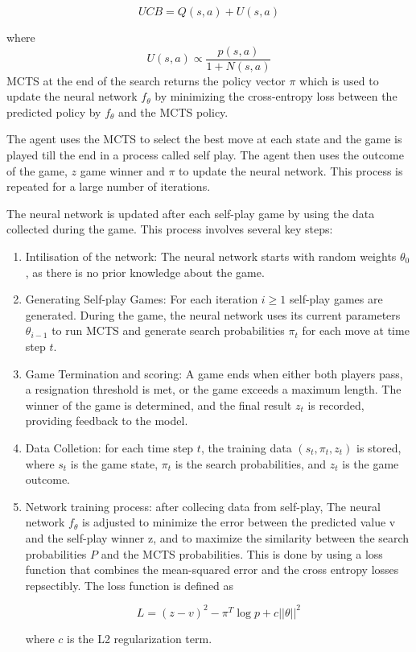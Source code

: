 \begin{equation}
    UCB = Q(s, a) + U(s, a)
\end{equation}

where \[U(s, a) \propto \frac{p(s, a)}{1 + N(s, a)}\] MCTS at the end of the search returns the policy vector \( \pi \) which is used
to update the neural network \( f_\theta \) by minimizing the cross-entropy
loss between the predicted policy by $f_\theta$ and the MCTS policy.

The agent uses the MCTS to select the best move at each state and the game is
played till the end in a process called self play. The agent then uses the
outcome of the game, $z$ game winner and $\pi$ to update the neural network.
This process is repeated for a large number of iterations.


The neural network is updated after each self-play game by using the data
collected during the game. This process involves several key steps:
\begin{enumerate}
    \item Intilisation of the network: The neural network starts with random weights
          $\theta_0$, as there is no prior knowledge about the game.
    \item Generating Self-play Games: For each iteration $i \geq 1$ self-play games are
          generated. During the game, the neural network uses its current parameters
          $\theta_{i - 1}$ to run MCTS and generate search probabilities $\pi_t$ for each
          move at time step $t$.
    \item Game Termination and scoring: A game ends when either both players pass, a
          resignation threshold is met, or the game exceeds a maximum length. The winner
          of the game is determined, and the final result $z_t$ is recorded, providing
          feedback to the model.
    \item Data Colletion: for each time step $t$, the training data $(s_t, \pi_t, z_t)$
          is stored, where $s_t$ is the game state, $\pi_t$ is the search probabilities,
          and $z_t$ is the game outcome.
    \item Network training process: after collecing data from self-play, The neural
          network $f_\theta$ is adjusted to minimize the error between the predicted
          value v and the self-play winner z, and to maximize the similarity between the
          search probabilities $P$ and the MCTS probabilities. This is done by using a
          loss function that combines the mean-squared error and the cross entropy losses
          repsectibly. The loss function is defined as

          \begin{equation}
              L = (z - v)^2 - \pi^T \log p + c||\theta||^2
          \end{equation}

          where $c$ is the L2 regularization term.

\end{enumerate}

